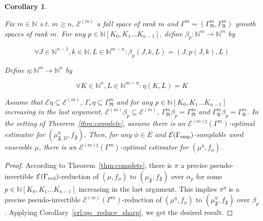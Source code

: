 \documentclass{article}
\numberwithin{equation}{section}
\theoremstyle{definition}
\theoremstyle{plain}
\newtheorem{corollary}{Corollary}[section]
\newcommand{\Nats}{\mathbb{N}}
\newcommand{\NatPoly}{\Nats[K_0, K_1 \ldots K_{n-1}]}
\newcommand{\GrowR}{\Gamma_{\mathfrak{R}}}
\newcommand{\GrowA}{\Gamma_{\mathfrak{A}}}
\newcommand{\Fall}{\mathcal{E}}
\begin{document}
\begin{samepage}
\begin{corollary}
\label{crl:complete_sharp}

Fix ${m \in \Nats}$ s.t. ${m \geq n}$, ${\Fall^{(m)}}$ a fall space of rank ${m}$ and ${\Gamma^m=(\GrowR^m, \GrowA^m)}$ growth spaces of rank ${m}$. For any ${p \in \NatPoly}$, define ${\beta_p: \Nats^m \rightarrow \Nats^m}$ by 

\begin{equation}
\forall J \in \Nats^{n-1}, k \in \Nats, L \in \Nats^{m-n}: \beta_p(J,k,L)=(J,p(J,k),L)
\end{equation}

Define ${\eta: \Nats^{m} \rightarrow \Nats^n}$ by

\begin{equation}
\forall K \in \Nats^n, L \in \Nats^{m-n}: \eta(K,L)=K
\end{equation}

Assume that ${\Fall \eta \subseteq \Fall^{(m)}}$, ${\Gamma_r \eta \subseteq \GrowR^{m}}$ and for any ${p \in \NatPoly}$ increasing in the last argument, ${\Fall^{(m)} \beta_p \subseteq \Fall^{(m)}}$, ${\GrowR^m \beta_p = \GrowR^m}$ and ${\GrowA^m \beta_p = \GrowA^m}$. In the setting of Theorem~\ref{thm:complete}, assume there is an ${\Fall^{(m)\sharp}(\Gamma^m)}$-optimal estimator for ${(\mu_{\mathfrak{F},D}^\eta,f_{\mathfrak{F}})}$. Then, for any ${\phi \in E}$ and ${\Fall(\Gamma_{\textnormal{smp}})}$-samplable word ensemble ${\mu}$, there is an ${\Fall^{(m)\sharp}(\Gamma^m)}$-optimal estimator for ${(\mu^\eta,f_\phi)}$.

\end{corollary}
\end{samepage}

\begin{proof}

According to Theorem~\ref{thm:complete}, there is ${\pi}$ a precise pseudo-invertible ${\Fall(\Gamma_{\textnormal{red}})}$-reduction of ${(\mu,f_\phi)}$ to ${(\mu_{\mathfrak{F}},f_{\mathfrak{F}})}$ over ${\alpha_p}$ for some ${p \in \NatPoly}$  increasing in the last argument. This implies ${\pi^\eta}$ is a precise pseudo-invertible ${\Fall^{(m)}(\Gamma^m)}$-reduction of ${(\mu^\eta,f_\phi)}$ to ${(\mu_{\mathfrak{F}}^\eta,f_{\mathfrak{F}})}$ over ${\beta_p}$. Applying Corollary~\ref{crl:pp_reduce_sharp}, we get the desired result. 
%
\end{proof}
\end{document}
